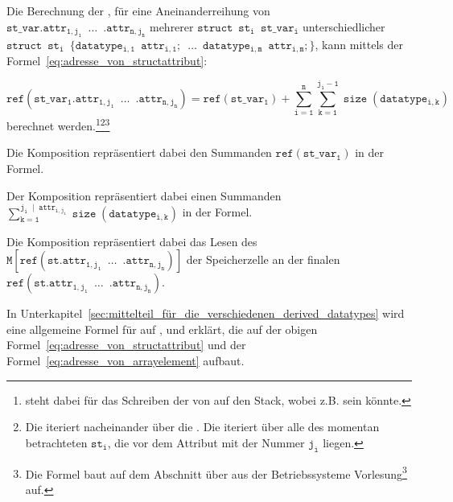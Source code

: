 \begin{Special_Paragraph}
  Die Berechnung der , für eine Aneinanderreihung von  $\mathtt{st\_var.attr_{1, j_1}\enspace\ldots\enspace .attr_{n, j_n}}$ mehrerer  $\mathtt{struct\enspace st_i\enspace st\_var_i}$ unterschiedlicher  $\mathtt{struct\enspace st_i\enspace \{datatype_{i, 1}\enspace attr_{i, 1};\enspace\ldots\enspace datatype_{i, m}\enspace attr_{i, m};\}}$, kann mittels der Formel~\ref{eq:adresse_von_structattribut}:

  \begin{equation}
    \mathtt{ref(st\_var_1.attr_{1, j_1}\enspace\ldots\enspace .attr_{n, j_n}) = ref(st\_var_1) + \sum_{i=1}^{n}\sum_{k=1}^{j_i - 1} \operatorname{size}(datatype_{i, k})}
    \label{eq:adresse_von_structattribut}
  \end{equation}
  berechnet werden.\footnote{ steht dabei für das Schreiben der  von  auf den Stack, wobei  z.B.  sein könnte.}\footnote{Die  iteriert nacheinander über die . Die  iteriert über alle  des momentan betrachteten  $\mathtt{st_i}$, die vor dem Attribut mit der Nummer $\mathtt{j_i}$ liegen.}\footnote{Die Formel baut auf dem Abschnitt über  aus der Betriebssysteme Vorlesung\footcite{scholl_betriebssysteme_2020} auf.}

  Die Komposition  repräsentiert dabei den Summanden $\mathtt{ref(st\_var_1)}$ in der Formel.

  Der Komposition  repräsentiert dabei einen Summanden $\mathtt{\sum_{k=1}^{j_i\;\mid\; attr_{i,j_i}} \operatorname{size}(datatype_{i, k})}$ in der Formel.

Die Komposition  repräsentiert dabei das Lesen des  $\mathtt{M\left[ref(st.attr_{1, j_1}\enspace\ldots\enspace .attr_{n, j_n})\right]}$ der Speicherzelle an der finalen   $\mathtt{ref(st.attr_{1, j_1}\enspace\ldots\enspace .attr_{n, j_n})}$.

In Unterkapitel~\ref{sec:mittelteil_für_die_verschiedenen_derived_datatypes} wird eine allgemeine Formel für  auf ,  und  erklärt, die auf der obigen Formel~\ref{eq:adresse_von_structattribut} und der Formel~\ref{eq:adresse_von_arrayelement} aufbaut.
\end{Special_Paragraph}


